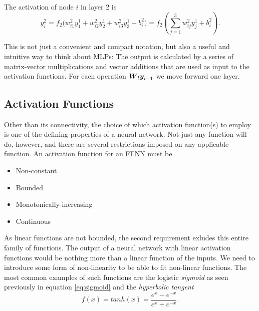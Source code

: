 The activation of node $i$ in layer 2 is
\begin{equation}
 y^2_i = f_2\Bigr(w^2_{i1}y^1_1 + w^2_{i2}y^1_2 + w^2_{i3}y^1_3 + b^2_i\Bigr) = 
 f_2\left(\sum_{j=1}^3 w^2_{ij} y_j^1 + b^2_i\right).
\end{equation}

This is not just a convenient and compact notation, but also a useful
and intuitive way to think about MLPs: The output is calculated by a
series of matrix-vector multiplications and vector additions that are
used as input to the activation functions. For each operation
${\boldsymbol{W}}_l {\boldsymbol{y}}_{l-1}$ we move forward one layer.

\subsection{Activation Functions}
Other than its connectivity, the choice of which activation function(s) to employ 
is one of the defining properties of a neural network. Not just any function will do,
however, and there are several restrictions imposed on any applicable function.
An activation function for an FFNN must be
\begin{itemize}
	\item Non-constant
	\item Bounded
	\item Monotonically-increasing
	\item Continuous
\end{itemize}

\noindent As linear functions are not bounded, the second requirement exludes this entire family of functions.
The output of a neural network with linear activation functions would be nothing more than a linear function
of the inputs. We need to introduce some form of non-linearity to be able to fit non-linear functions.
The most common examples of such functions are the logistic \textit{sigmoid} as seen
previously in equation \ref{eq:sigmoid}
and the \textit{hyperbolic tangent}
\begin{equation}\label{eq:hyp-tangent}
	f(x) = tanh(x) = \frac{e^x - e^{-x}}{e^x + e^{-x}}.
\end{equation}

